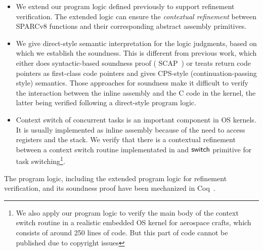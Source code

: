 \begin{itemize}
    \item
    We extend our program logic defined 
    previously to support refinement verification. 
    The extended logic can ensure 
    the {\it contextual refinement} between
    SPARCv8 functions and their corresponding 
    abstract assembly primitives. 

    \item
    We give direct-style semantic interpretation for
    the logic judgments, based on which we establish the
    soundness. This is different from previous
    work, which either does syntactic-based soundness proof
    (\eg{} SCAP~\cite{Feng06pldi}) or treats return code pointers
    as first-class code pointers and gives CPS-style 
    (continuation-passing style) semantics.
    Those approaches for soundness make it difficult to verify
    the interaction between the inline assembly and the C
    code in the kernel, the latter being verified following
    a direct-style program logic.

    \item
	Context switch of concurrent tasks is an important
    component in OS kernels. It is usually implemented
    as inline assembly because of the need to access
    registers and the stack. 
    We verify that there is a contextual refinement 
    between a context switch routine implementated 
    in \sparc{} and $\mathsf{switch}$ primitive for task 
    switching\footnote{We also apply our program logic to 
    verify the main body of the context switch routine
	in a realistic embedded OS kernel for aerospace crafts,
    which consists of around 250 lines of \sparc{} code. 
    But this part of code cannot 
    be published due to copyright issues}. 


\end{itemize}
The program logic, including the extended program logic 
for refinement verification, and its soundness proof 
have been mechanized in Coq~\cite{coqimp}. 

